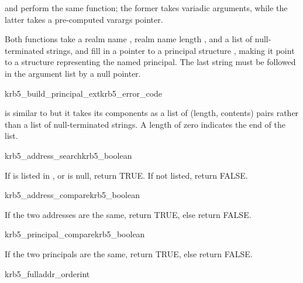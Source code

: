 and 
perform the same function; the former takes variadic arguments, while
the latter takes a pre-computed varargs pointer.

Both functions take a realm name , realm name length
, and a list of null-terminated strings, and fill in a
pointer to a principal structure , making it point to a
structure representing the named principal.
The last string must be followed in the argument list by a null pointer.


\begin{funcdecl}{krb5_build_principal_ext}{krb5_error_code}{\funcout}
\funcin
{}
\end{funcdecl}

 is similar to
 but it takes its components as a list of
(length, contents) pairs rather than a list of null-terminated strings.
A length of zero indicates the end of the list.

\begin{funcdecl}{krb5_address_search}{krb5_boolean}{\funcin}
\end{funcdecl}

If  is listed in , or
 is null, return TRUE.  If not listed, return FALSE.

\begin{funcdecl}{krb5_address_compare}{krb5_boolean}{\funcin}
\end{funcdecl}

If the two addresses are the same, return TRUE, else return FALSE.

\begin{funcdecl}{krb5_principal_compare}{krb5_boolean}{\funcin}
\end{funcdecl}

If the two principals are the same, return TRUE, else return FALSE.

\begin{funcdecl}{krb5_fulladdr_order}{int}{\funcin}
\end{funcdecl}

